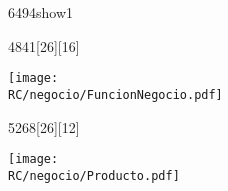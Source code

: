 \begin{NuevaPagina}{64}{94}{show1}
	
	\begin{NuevoParrafo}{48}{41}[26][16]
		\begin{Marco}[\LineaSupC][\LineaInfC][\LineaIzqC][\LineaDerC][CBlanco]
			\subseccionC{\PVFNe}%
			\centering\texttt{[image: \\RC/negocio/FuncionNegocio.pdf]}
		\end{Marco}
	\end{NuevoParrafo}
	\begin{NuevoParrafo}{52}{68}[26][12]
		\begin{Marco}[\LineaSupC][\LineaInfC][\LineaIzqC][\LineaDerC][CBlanco]
			\subseccionC{\Pro}%
			\centering\texttt{[image: \\RC/negocio/Producto.pdf]}
		\end{Marco}
	\end{NuevoParrafo}
	
\end{NuevaPagina}